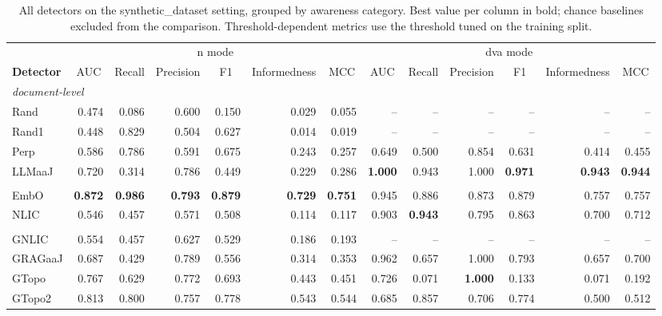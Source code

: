 \begin{table}[t]
  \centering
  \scriptsize
  \setlength{\tabcolsep}{2.5pt}
  \begin{tabular}{lrrrrrrrrrrrr}
    \toprule
    & \multicolumn{6}{c}{n mode} & \multicolumn{6}{c}{dva mode} \\
    \cmidrule(lr){2-7} \cmidrule(lr){8-13}
    \textbf{Detector} & \multicolumn{1}{c}{AUC} & \multicolumn{1}{c}{Recall} & \multicolumn{1}{c}{Precision} & \multicolumn{1}{c}{F1} & \multicolumn{1}{c}{Informedness} & \multicolumn{1}{c}{MCC} & \multicolumn{1}{c}{AUC} & \multicolumn{1}{c}{Recall} & \multicolumn{1}{c}{Precision} & \multicolumn{1}{c}{F1} & \multicolumn{1}{c}{Informedness} & \multicolumn{1}{c}{MCC} \\
    \midrule
    \multicolumn{13}{l}{\textit{document-level}} \\
    Rand & 0.474 & 0.086 & 0.600 & 0.150 & 0.029 & 0.055 & -- & -- & -- & -- & -- & -- \\
    Rand1 & 0.448 & 0.829 & 0.504 & 0.627 & 0.014 & 0.019 & -- & -- & -- & -- & -- & -- \\
    Perp & 0.586 & 0.786 & 0.591 & 0.675 & 0.243 & 0.257 & 0.649 & 0.500 & 0.854 & 0.631 & 0.414 & 0.455 \\
    LLMaaJ & 0.720 & 0.314 & 0.786 & 0.449 & 0.229 & 0.286 & \textbf{1.000} & 0.943 & 1.000 & \textbf{0.971} & \textbf{0.943} & \textbf{0.944} \\
    \addlinespace
    \multicolumn{13}{l}{\textit{embedding-aware}} \\
    EmbO & \textbf{0.872} & \textbf{0.986} & \textbf{0.793} & \textbf{0.879} & \textbf{0.729} & \textbf{0.751} & 0.945 & 0.886 & 0.873 & 0.879 & 0.757 & 0.757 \\
    NLIC & 0.546 & 0.457 & 0.571 & 0.508 & 0.114 & 0.117 & 0.903 & \textbf{0.943} & 0.795 & 0.863 & 0.700 & 0.712 \\
    \addlinespace
    \multicolumn{13}{l}{\textit{grag-aware}} \\
    GNLIC & 0.554 & 0.457 & 0.627 & 0.529 & 0.186 & 0.193 & -- & -- & -- & -- & -- & -- \\
    GRAGaaJ & 0.687 & 0.429 & 0.789 & 0.556 & 0.314 & 0.353 & 0.962 & 0.657 & 1.000 & 0.793 & 0.657 & 0.700 \\
    GTopo & 0.767 & 0.629 & 0.772 & 0.693 & 0.443 & 0.451 & 0.726 & 0.071 & \textbf{1.000} & 0.133 & 0.071 & 0.192 \\
    GTopo2 & 0.813 & 0.800 & 0.757 & 0.778 & 0.543 & 0.544 & 0.685 & 0.857 & 0.706 & 0.774 & 0.500 & 0.512 \\
    \bottomrule
  \end{tabular}
  \caption{All detectors on the synthetic_dataset setting, grouped by awareness category. Best value per column in bold; chance baselines excluded from the comparison. Threshold-dependent metrics use the threshold tuned on the training split.}
  \label{tab:setting-synthetic-dataset}
\end{table}
